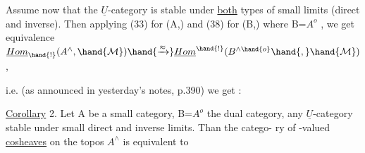 Assume now that the $\underline{U}$-category  is stable under \uline{both} types of
small limits (direct and inverse). Then applying (33) for (A,) and
(38) for (B,) where B=$A^{o}$ , we get  equivalence
  \hand{:} $\underline{Hom}_{\hand{!}}(A^{\wedge}, \hand{\mathcal{M}}) \hand{\xrightarrow{\approx}} \underline{Hom}^{\hand{!}}(B^{\wedge\hand{o}}\hand{,} \hand{\mathcal{M}})$ ,

i.e. (as announced in yesterday's notes, p.390) we get :

\uline{Corollary} 2. Let A be a small category, B=$A^{o}$ the dual category,  any
$\underline{U}$-category stable under small direct and inverse limits. Than the catego-%
ry of -valued \uline{cosheaves} on the topos $A^{\wedge}$ is equivalent  to

